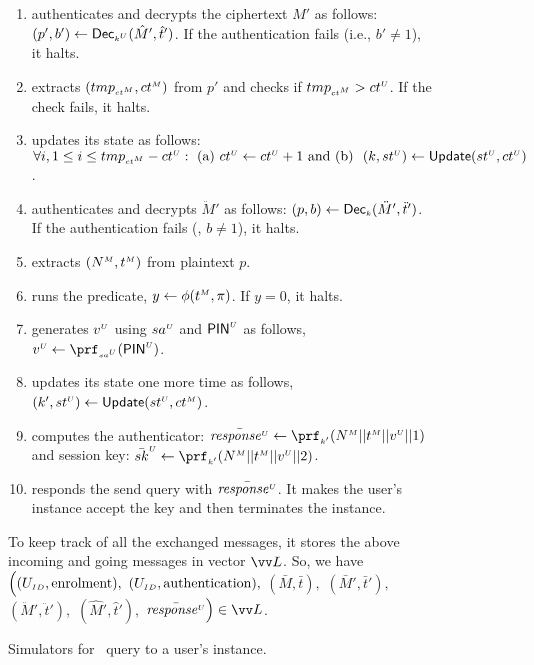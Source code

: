 \begin{figure}[H]
\begin{center}
\begin{tcolorbox}[enhanced,width=4.7in,left=0.1cm, 
    drop fuzzy shadow southwest,
    colframe=black,colback=white]
{{\begin{itemize}[leftmargin=.4cm]
\begin{itemize}[leftmargin=.4cm]
\begin{enumerate}
 \item   authenticates and decrypts the ciphertext $\hat M'$ as follows: $(p', b') \gets \mathsf{Dec}_{\scriptscriptstyle k^{\scriptscriptstyle U}}(\hat M', \hat t')$. If the authentication fails (i.e., $b'\neq 1$), it halts.  
  \item extracts $({tmp}_{\scriptscriptstyle{ct}^{\scriptscriptstyle M}}, {ct}^{\scriptscriptstyle M})$ from $p'$ and checks if ${tmp}_{\scriptscriptstyle{ct}^{\scriptscriptstyle M}} > {ct}^{\scriptscriptstyle U} $. If the check fails, it halts. 
 \item updates its state as follows: $\forall i, 1\leq i\leq {tmp}_{\scriptscriptstyle{ct}^{\scriptscriptstyle M}}- {ct}^{\scriptscriptstyle U}: \text{\ (a)\ } {ct}^{\scriptscriptstyle U} \gets {ct}^{\scriptscriptstyle U} + 1\text{\ and (b) \ } (k,  {st}^{\scriptscriptstyle U}) \gets \mathsf{Update}({st}^{\scriptscriptstyle U}, {ct}^{\scriptscriptstyle U})$. 
 \item  authenticates and decrypts $\ddot M'$ as follows: $(p, b) \gets \mathsf{Dec}_{\scriptscriptstyle k}(\ddot M', \ddot t')$. If the authentication fails (\ie, $b\neq 1$), it halts.
 \item    extracts $({N}^{\scriptscriptstyle M}, {t}^{\scriptscriptstyle M})$ from plaintext $p$.  
 \item runs the predicate, $y \leftarrow\phi({t}^{\scriptscriptstyle M}, \pi)$. If $y=0$, it halts. 
\item generates ${v}^{\scriptscriptstyle U}$ using ${sa}^{\scriptscriptstyle U}$ and $\mathsf{PIN}^{\scriptscriptstyle U}$ as follows, $\VC{\verifier} \gets \prf_{\sss\VC{\salt}}(\VC{\pin})$.
 \item updates its state one more time as follows, $(k',  {st}^{\scriptscriptstyle U}) \gets \mathsf{Update}({st}^{\scriptscriptstyle U}, {ct}^{\scriptscriptstyle M})$.
 \item computes  the authenticator: $\bar{\VC{\mathit{response}}} \gets \prf_{\sss k'}( \VM{\nonce} || \VM{\trans} || \VC{\verifier}|| 1)$ and session key:  $\bar {sk}^{\sss U} \gets \prf_{\sss k'}( \VM{\nonce} || \VM{\trans} || \VC{\verifier}|| 2)$.
 \item responds the send query with  $\bar{\mathit{response}^{\scriptscriptstyle U}}$. It makes the user's instance accept the key and then terminates the instance. 
 \end{enumerate}
 \end{itemize}
 \end{itemize}
}}
To keep track of all the exchanged messages, it stores the above incoming and going messages in vector $\vv L$. So, we have $\Big((U_{\scriptscriptstyle ID},  \text{enrolment}),$ $ (U_{\scriptscriptstyle ID},  \text{authentication}), $ $(\bar M, \bar t), $ $(\bar M', \bar t'),$ $(\ddot M', \ddot t'), $ $(\hat M', \hat t'), $ $\bar{\VC{\mathit{response}}}\Big)\in \vv L$.
\end{tcolorbox}
\end{center}
\vspace{-5mm}
\caption{Simulators for \send\ query to  a user's instance.} 
\label{fig::Send-sim-to-client}
\end{figure}



